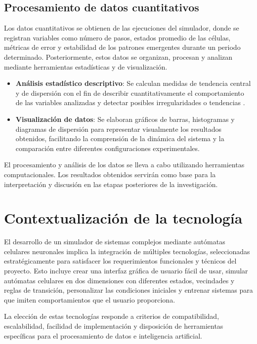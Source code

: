 \subsection{Procesamiento de datos cuantitativos}

Los datos cuantitativos se obtienen de las ejecuciones del simulador, donde se registran variables como número de pasos, estados promedio de las células, métricas de error y estabilidad de los patrones emergentes durante un periodo determinado. Posteriormente, estos datos se organizan, procesan y analizan mediante herramientas estadísticas y de visualización.

\begin{itemize}
	\item \textbf{Análisis estadístico descriptivo}: Se calculan medidas de tendencia central y de dispersión con el fin de describir cuantitativamente el comportamiento de las variables analizadas y detectar posibles irregularidades o tendencias \cite{question2023_estadistico}.
	
	\item \textbf{Visualización de datos}: Se elaboran gráficos de barras, histogramas y diagramas de dispersión para representar visualmente los resultados obtenidos, facilitando la comprensión de la dinámica del sistema y la comparación entre diferentes configuraciones experimentales.
\end{itemize}

El procesamiento y análisis de los datos se lleva a cabo utilizando herramientas computacionales. Los resultados obtenidos servirán como base para la interpretación y discusión en las etapas posteriores de la investigación.

\section{Contextualización de la tecnología}

El desarrollo de un simulador de sistemas complejos mediante autómatas celulares neuronales implica la integración de múltiples tecnologías, seleccionadas estratégicamente para satisfacer los requerimientos funcionales y técnicos del proyecto. Esto incluye crear una interfaz gráfica de usuario fácil de usar, simular autómatas celulares en dos dimensiones con diferentes estados, vecindades y reglas de transición, personalizar las condiciones iniciales y entrenar sistemas para que imiten comportamientos que el usuario proporciona.

La elección de estas tecnologías responde a criterios de compatibilidad, escalabilidad, facilidad de implementación y disposición de herramientas específicas para el procesamiento de datos e inteligencia artificial. 

